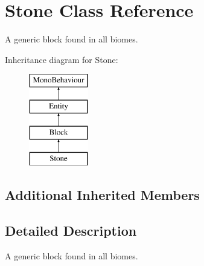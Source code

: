 \hypertarget{class_stone}{}\section{Stone Class Reference}
\label{class_stone}


A generic block found in all biomes.  


Inheritance diagram for Stone\+:\begin{figure}[H]
\begin{center}
\leavevmode
\includegraphics[height=4.000000cm]{class_stone}
\end{center}
\end{figure}
\subsection*{Additional Inherited Members}


\subsection{Detailed Description}
A generic block found in all biomes. 


